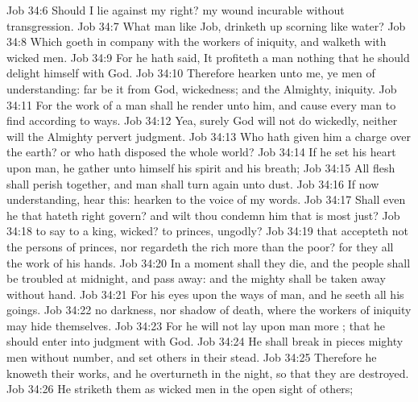 \vs Job 34:6 Should I lie against my right? my wound  incurable without transgression.
\vs Job 34:7 What man  like Job,  drinketh up scorning like water?
\vs Job 34:8 Which goeth in company with the workers of iniquity, and walketh with wicked men.
\vs Job 34:9 For he hath said, It profiteth a man nothing that he should delight himself with God.
\vs Job 34:10 Therefore hearken unto me, ye men of understanding: far be it from God,  wickedness; and  the Almighty,  iniquity.
\vs Job 34:11 For the work of a man shall he render unto him, and cause every man to find according to  ways.
\vs Job 34:12 Yea, surely God will not do wickedly, neither will the Almighty pervert judgment.
\vs Job 34:13 Who hath given him a charge over the earth? or who hath disposed the whole world?
\vs Job 34:14 If he set his heart upon man,  he gather unto himself his spirit and his breath;
\vs Job 34:15 All flesh shall perish together, and man shall turn again unto dust.
\vs Job 34:16 If now  understanding, hear this: hearken to the voice of my words.
\vs Job 34:17 Shall even he that hateth right govern? and wilt thou condemn him that is most just?
\vs Job 34:18  to say to a king,  wicked?  to princes,  ungodly?
\vs Job 34:19  that accepteth not the persons of princes, nor regardeth the rich more than the poor? for they all  the work of his hands.
\vs Job 34:20 In a moment shall they die, and the people shall be troubled at midnight, and pass away: and the mighty shall be taken away without hand.
\vs Job 34:21 For his eyes  upon the ways of man, and he seeth all his goings.
\vs Job 34:22  no darkness, nor shadow of death, where the workers of iniquity may hide themselves.
\vs Job 34:23 For he will not lay upon man more ; that he should enter into judgment with God.
\vs Job 34:24 He shall break in pieces mighty men without number, and set others in their stead.
\vs Job 34:25 Therefore he knoweth their works, and he overturneth  in the night, so that they are destroyed.
\vs Job 34:26 He striketh them as wicked men in the open sight of others;
